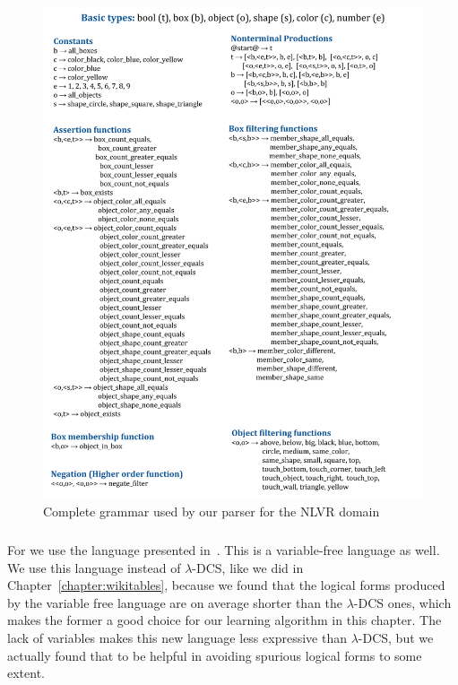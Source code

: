\begin{figure}
	\includegraphics[width=\textwidth]{figures/nlvr_grammar.png}
	\caption{Complete grammar used by our parser for the NLVR
	domain}\label{fig:nlvr_grammar}
\end{figure}

\subsubsection{\WTQ{}}
For \WTQ{} we use the language presented in~\cite{liang2018memory}. This is a
variable-free language as well. We use this language instead of $\lambda$-DCS,
like we did in Chapter~\ref{chapter:wikitables}, because we found that the
logical forms produced by the variable free language are on average shorter than
the $\lambda$-DCS ones, which makes the former a good choice for our learning
algorithm in this chapter. The lack of variables makes this new language less
expressive than $\lambda$-DCS, but we actually found that to be helpful in
avoiding spurious logical forms to some extent.

